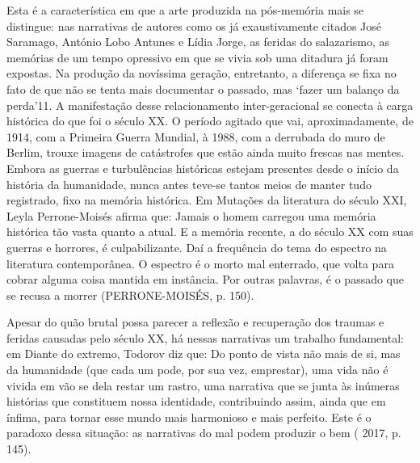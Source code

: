 \documentclass[../DISSERTACAO_MAIN.tex]{subfiles}
\begin{document}
Esta é a característica em que a arte produzida na pós-memória mais se distingue: nas narrativas de autores como os já exaustivamente citados José Saramago, António Lobo Antunes e Lídia Jorge, as feridas do salazarismo, as memórias de um tempo opressivo em que se vivia sob uma ditadura já foram expostas. Na produção da novíssima geração, entretanto, a diferença se fixa no fato de que não se tenta mais documentar o passado, mas ‘fazer um balanço da perda’11.
A manifestação desse relacionamento inter-geracional se conecta à carga histórica do que foi o século XX. O período agitado que vai, aproximadamente, de 1914, com a Primeira Guerra Mundial, à 1988, com a derrubada do muro de Berlim, trouxe imagens de catástrofes que estão ainda muito frescas nas mentes. Embora as guerras e turbulências históricas estejam presentes desde o início da história da humanidade, nunca antes teve-se tantos meios de manter tudo registrado, fixo na memória histórica. Em Mutações da literatura do século XXI, Leyla Perrone-Moisés afirma que:
Jamais o homem carregou uma memória histórica tão vasta quanto a atual. E a memória recente, a do século XX com suas guerras e horrores, é culpabilizante. Daí a frequência do tema do espectro na literatura contemporânea. O espectro é o morto mal enterrado, que volta para cobrar alguma coisa mantida em instância. Por outras palavras, é o passado que se recusa a morrer (PERRONE-MOISÉS, p. 150).

Apesar do quão brutal possa parecer a reflexão e recuperação dos traumas e feridas causadas pelo século XX, há nessas narrativas um trabalho fundamental: em Diante do extremo, Todorov diz que:
Do ponto de vista não mais de si, mas da humanidade (que cada um pode, por sua vez, emprestar), uma vida não é vivida em vão se dela restar um rastro, uma narrativa que se junta às inúmeras histórias que constituem nossa identidade, contribuindo assim, ainda que em ínfima, para tornar esse mundo mais harmonioso e mais perfeito. Este é o paradoxo dessa situação: as narrativas do mal podem produzir o bem ( 2017, p. 145).
\end{document}
